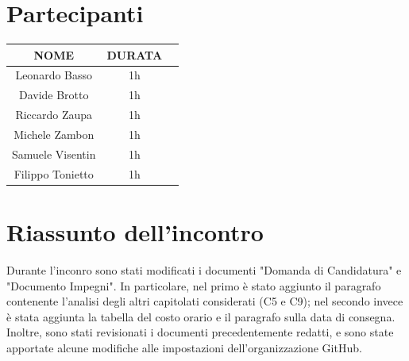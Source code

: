 \documentclass[12pt, oneside]{article}
\begin{document}
\section{Partecipanti}

\begin{center}
	\begin{tabular}{ | c | c | c | }
		\hline
		NOME & DURATA \\ 
		\hline
		Leonardo Basso & 1h \\  
		\hline 
		Davide Brotto & 1h \\   
        \hline
        Riccardo Zaupa & 1h \\   
		\hline
        Michele Zambon & 1h \\   
        \hline
        Samuele Visentin & 1h \\
        \hline
        Filippo Tonietto & 1h \\
        \hline
	\end{tabular}
\end{center}

\section{Riassunto dell'incontro}
Durante l'inconro sono stati modificati i documenti "Domanda di Candidatura" e "Documento Impegni". In particolare, nel primo è stato aggiunto il paragrafo contenente l'analisi degli altri capitolati considerati (C5 e C9); nel secondo invece è stata aggiunta la tabella del costo orario e il paragrafo sulla data di consegna. \\
Inoltre, sono stati revisionati i documenti precedentemente redatti, e sono state apportate alcune modifiche alle impostazioni dell'organizzazione GitHub.
\end{document}
